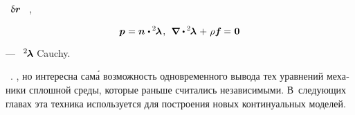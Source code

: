 \begin{otherlanguage}{russian}
\noindent
{}~$\updelta\hspace{-0.1ex}\bm{r}$   ~, 

\nopagebreak\vspace{-0.2em}\begin{equation*}
\bm{p} \hspace{.1ex} = \currentunitnormal \hspace{.1ex} \dotp \hspace{-0.1ex} {^2\hspace{-0.2ex}\bm{\lambda}} \hspace{.2ex},
\:\:
\boldnabla \hspace{.1ex} \dotp \hspace{-0.1ex} {^2\hspace{-0.2ex}\bm{\lambda}} \hspace{.2ex} + \hspace{.2ex} \rho \bm{f} \hspace{-0.1ex} = \hspace{.1ex} \bm{0}
\end{equation*}

\vspace{-0.25em}\noindent
---  ~${\hspace{-0.16ex} ^2\hspace{-0.2ex}\bm{\lambda}}$  Cauchy.

   ~\cite{rabotnov-mechanicsofdeformable}.
, но интересна сам\'{а} возможность одно\-времен\-ного вывода тех уравнений механики сплошной среды, которые раньше считались независимыми.
В~следующих главах эта техника используется для построения новых континуальных моделей.

\end{otherlanguage}

\section*{\small \wordforbibliography}

